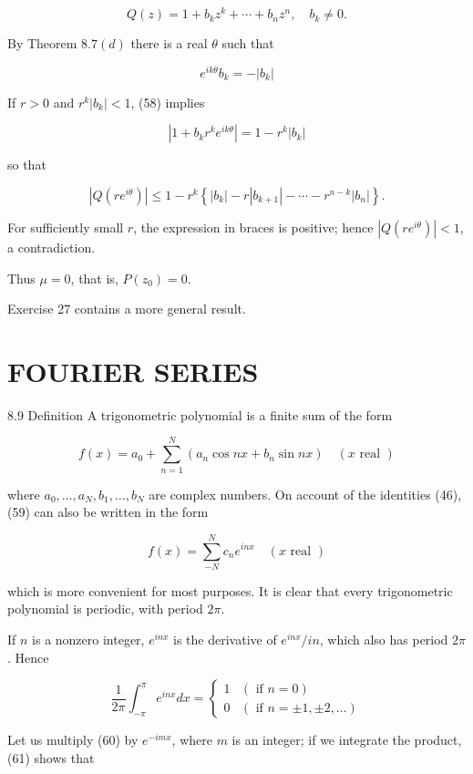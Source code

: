 \documentclass[10pt]{article}
\begin{document}
$$
Q(z)=1+b_{k} z^{k}+\cdots+b_{n} z^{n}, \quad b_{k} \neq 0 .
$$

By Theorem $8.7(d)$ there is a real $\theta$ such that

$$
e^{i k \theta} b_{k}=-\left|b_{k}\right|
$$

If $r>0$ and $r^{k}\left|b_{k}\right|<1$, (58) implies

$$
\left|1+b_{k} r^{k} e^{i k \theta}\right|=1-r^{k}\left|b_{k}\right|
$$

so that

$$
\left|Q\left(r e^{i \theta}\right)\right| \leq 1-r^{k}\left\{\left|b_{k}\right|-r\left|b_{k+1}\right|-\cdots-r^{n-k}\left|b_{n}\right|\right\} .
$$

For sufficiently small $r$, the expression in braces is positive; hence $\left|Q\left(r e^{i \theta}\right)\right|<1$, a contradiction.

Thus $\mu=0$, that is, $P\left(z_{0}\right)=0$.

Exercise 27 contains a more general result.

\section{FOURIER SERIES}
8.9 Definition A trigonometric polynomial is a finite sum of the form

$$
f(x)=a_{0}+\sum_{n=1}^{N}\left(a_{n} \cos n x+b_{n} \sin n x\right) \quad(x \text { real })
$$

where $a_{0}, \ldots, a_{N}, b_{1}, \ldots, b_{N}$ are complex numbers. On account of the identities (46), (59) can also be written in the form

$$
f(x)=\sum_{-N}^{N} c_{n} e^{i n x} \quad(x \text { real })
$$

which is more convenient for most purposes. It is clear that every trigonometric polynomial is periodic, with period $2 \pi$.

If $n$ is a nonzero integer, $e^{i n x}$ is the derivative of $e^{i n x} / i n$, which also has period $2 \pi$. Hence

$$
\frac{1}{2 \pi} \int_{-\pi}^{\pi} e^{i n x} d x= \begin{cases}1 & (\text { if } n=0) \\ 0 & (\text { if } n= \pm 1, \pm 2, \ldots)\end{cases}
$$

Let us multiply (60) by $e^{-i m x}$, where $m$ is an integer; if we integrate the product, (61) shows that
\end{document}
